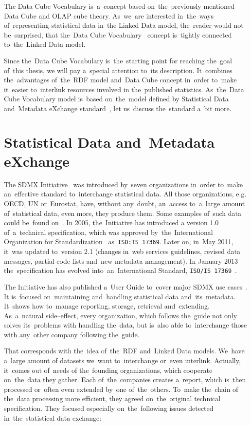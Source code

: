 The Data Cube Vocabulary is~a~concept based on~the~previously mentioned Data Cube and
OLAP cube theory. As~we~are interested in~the~ways of~representing statistical data in~the
Linked Data model, the~reader would not be~surprised, that the~Data Cube 
Vocabulary~\cite{dcv}
concept is~tightly connected to~the~Linked Data model.

Since the~Data Cube Vocabulary is~the~starting point for reaching the~goal of~this thesis,
we will pay a~special attention to~its description. It~combines the~advantages of~the~RDF
model and~Data Cube concept in~order to~make it~easier to~interlink resources involved
in the~published statistics. As~the~Data Cube Vocabulary model is~based on~the~model defined
by Statistical Data and~Metadata eXchange standard~\cite{sdmx}, let us~discuss the~standard a~bit more.

\section{Statistical Data and~Metadata eXchange}
The SDMX Initiative~\cite{sdmx} was introduced by~seven organizations in~order to~make
an~effective standard to~interchange statistical data. All those organizations, e.g. OECD,
UN or~Eurostat, have, without any~doubt, an~access to~a~large amount of~statistical data, even more,
they produce them. Some examples of~such data could be~found on~\cite{pubdata}.
In 2005, the~Initiative has introduced a
version 1.0 of~a~technical specification, which was approved by~the~International
Organization for Standardization~\cite{iso} as~\texttt{ISO:TS 17369}.
Later on, in~May 2011, it~was updated to~version 2.1 (changes in~web services guidelines,
revised data messages, partial code lists and~new metadata management).
In January 2013 the~specification has evolved into~an~International Standard,
\texttt{ISO/IS 17369}~\cite{isosdmx}.

\begin{sloppypar}
The Initiative has also published a~User Guide to~cover major SDMX use cases~\cite{sdmxuserguide}.
It is~focused on~maintaining and~handling statistical data and~its~metadata. It~shows
how to~manage reporting, storage, retrieval and~extending. As~a~natural side--effect,
every organization, which follows the~guide not only solves its~problems with
handling the~data, but is~also able to~interchange those with any~other company
following the~guide.
\end{sloppypar}

That corresponds with the~idea of~the~RDF and~Linked Data models. We~have a~large amount
of datasets we~want to~interchange or~even interlink. Actually, it~comes out of~needs
of the~founding organizations, which cooperate on~the~data they gather. Each of~the~companies creates
a~report, which is~then processed or~often even extended by~one of~the~others. To~make the~chain
of the~data processing more efficient, they agreed on~the~original technical specification.
They focused especially on~the~following issues detected in~the~statistical data exchange:

